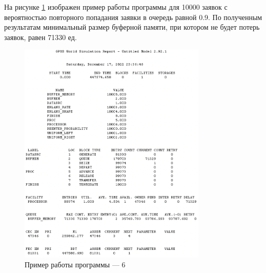 \documentclass[12pt]{report}
\begin{document}
На рисунке \ref{fig:pic6} изображен пример работы программы для 10000 заявок с вероятностью повторного попадания заявки в очередь равной 0.9. По полученным результатам минимальный размер буферной памяти, при котором не будет потерь заявок, равен 71330 ед.

\begin{figure}[h!btp]
	\centering
	\includegraphics[width=0.8\textwidth]{inc/pic6.png}
	\caption{Пример работы программы --- 6}
	\label{fig:pic6}	
\end{figure}

	
\end{document}

